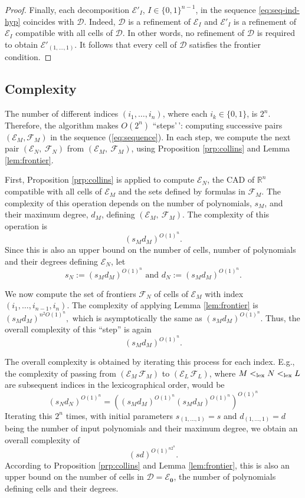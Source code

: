 \documentclass[
]{book}
\theoremstyle{definition}
\theoremstyle{definition}
\theoremstyle{definition}
\theoremstyle{definition}
\theoremstyle{remark}
\begin{document}
\begin{proof}
Finally, each decomposition \(\mathcal{E}'_I\), \(I \in \{0,1\}^{n-1}\), in the sequence \ref{eq:seq-ind-hyp} coincides with \(\mathcal{D}\). Indeed, \(\mathcal{D}\) is a refinement of \(\mathcal{E}_I\) and \(\mathcal{E}'_I\) is a refinement of \(\mathcal{E}_I\) compatible with all cells of \(\mathcal{D}\). In other words, no refinement of \(\mathcal{D}\) is required to obtain \(\mathcal{E}'_{(1,\ldots,1)}\).
It follows that every cell of \(\mathcal{D}\) satisfies the frontier condition.
\end{proof}

\hypertarget{complexity-2}{%
\subsection{Complexity}\label{complexity-2}}

The number of different indices \((i_1, \ldots, i_n)\), where each \(i_k \in \{ 0,1 \}\), is \(2^n\).
Therefore, the algorithm makes \(O(2^n)\) ``steps'\,': computing successive pairs \(({\mathcal E}_M, \mathcal{F}_M)\) in the sequence (\ref{eq:sequence}).
In each step, we compute the next pair \((\mathcal{E}_N,\ \mathcal{F}_N)\) from \((\mathcal{E}_M,\ \mathcal{F}_M)\), using Proposition \ref{prp:collins} and Lemma \ref{lem:frontier}.

First, Proposition \ref{prp:collins} is applied to compute \(\mathcal{E}_N\), the CAD of \(\mathbb{R}^n\) compatible with all cells of \(\mathcal{E}_M\) and the sets defined by formulas in \(\mathcal{F}_M\). The complexity of this operation depends on the number of polynomials, \(s_M\), and their maximum degree, \(d_M\), defining \((\mathcal{E}_M,\ \mathcal{F}_M)\).
The complexity of this operation is
\[
(s_Md_M)^{O(1)^n}.
\]
Since this is also an upper bound on the number of cells, number of polynomials and their degrees defining \(\mathcal{E}_N\), let
\[
s_N:=(s_Md_M)^{O(1)^n} \text{ and } d_N:=(s_Md_M)^{O(1)^n}.
\]

We now compute the set of frontiers \(\mathcal{F}_N\) of cells of \(\mathcal{E}_M\) with index \((i_1,\ldots,i_{n-1},i_n)\).
The complexity of applying Lemma \ref{lem:frontier} is
\((s_Md_M)^{n^2O(1)^n},\)
which is asymptotically the same as \((s_Md_M)^{O(1)^n}\).
Thus, the overall complexity of this ``step'' is again \[(s_Md_M)^{O(1)^n}.\]

The overall complexity is obtained by iterating this process for each index. E.g., the complexity of passing from \((\mathcal{E}_M\, \mathcal{F}_M)\) to \((\mathcal{E}_L\, \mathcal{F}_L)\), where \(M <_{\rm{lex}}N <_{\rm{lex}}L\) are subsequent indices in the lexicographical order, would be
\[
(s_Nd_N)^{O(1)^n} = \left((s_Md_M)^{O(1)^n}(s_Md_M)^{O(1)^n}\right)^{O(1)^n}
\]
Iterating this \(2^n\) times, with initial parameters \(s_{(1, \ldots,1)}=s\) and \(d_{(1, \ldots,1)}=d\) being the number of input polynomials and their maximum degree, we obtain an overall complexity of
\[
(sd)^{O(1)^{n2^n}}.
\]
According to Proposition \ref{prp:collins} and Lemma \ref{lem:frontier}, this is also an upper bound on the number of cells in \(\mathcal D={\mathcal E}_{\mathbf{0}}\), the number of polynomials defining cells and their degrees.
\end{document}
